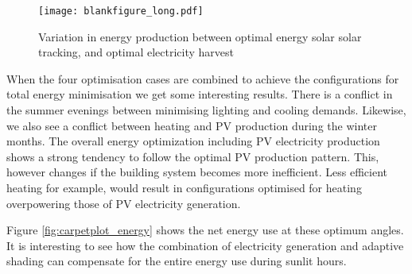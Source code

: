 \begin{figure*}
\begin{center}
\texttt{[image: blankfigure\_long.pdf]}
\caption{Variation in energy production between optimal energy solar solar tracking, and optimal electricity harvest}
\label{fig:solardiff}
\end{center}
\end{figure*}

When the four optimisation cases are combined to achieve the configurations for total energy minimisation we get some interesting results. There is a conflict in the summer evenings between minimising lighting and cooling demands. Likewise, we also see a conflict between heating and PV production during the winter months. The overall energy optimization including PV electricity production shows a strong tendency to follow the optimal PV production pattern. This, however changes if the building system becomes more inefficient. Less efficient heating for example, would result in configurations optimised for heating overpowering those of PV electricity generation.


Figure \ref{fig:carpetplot_energy} shows the net energy use at these optimum angles. It is interesting to see how the combination of electricity generation and adaptive shading can compensate for the entire energy use during sunlit hours.


